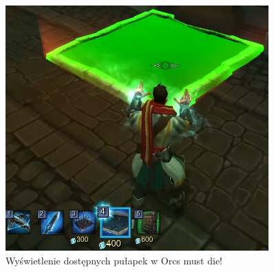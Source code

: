 \begin{figure}[h!tbp]
    \centering
    \includegraphics[width=0.9\textwidth]{images/ui/buoildingsOrcs.png}
    \caption{Wyświetlenie dostępnych pułapek w Orcs must die!}\label{fig:Orcs}
\end{figure}